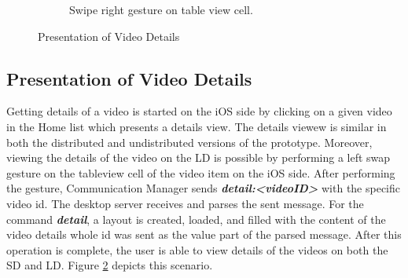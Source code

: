 \begin{figure}
\begin{subfigure}[b]{0.3\textwidth}
        \caption{Swipe right gesture on table view cell.}
        \label{fig:figure44b}
    \end{subfigure}
   \caption{Presentation of Video Details}\label{fig:figure44}
\end{figure}

\subsection{Presentation of Video Details}
Getting details of a video is started on the iOS side by clicking on a given video in the Home list which presents a details view. The details viewew is similar in both the distributed and undistributed versions of the prototype. Moreover, viewing the details of the video on the LD is possible by performing a left swap gesture on the tableview cell of the video item on the iOS side. After performing the gesture, Communication Manager sends \textbf{\textit{detail:<videoID>}} with the specific video id. The desktop server receives and parses the sent message. For the command \textbf{\textit{detail}}, a layout is created, loaded, and filled with the content of the video details whole id was sent as the value part of the parsed message. After this operation is complete, the user is able to view details of the videos on both the SD and LD. Figure \ref{fig:figure44} depicts this scenario.

